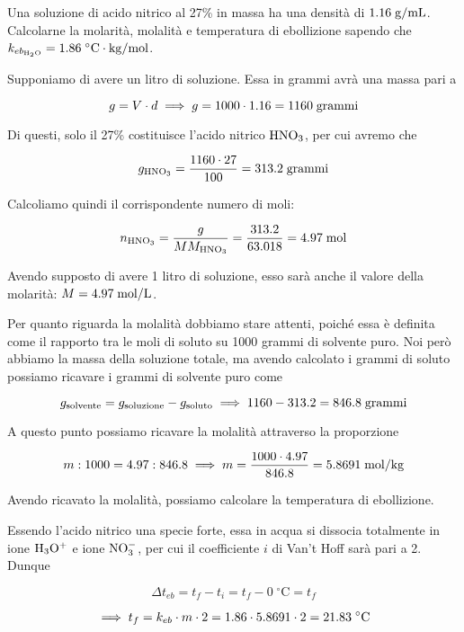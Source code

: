 \newpage

\begin{esercizio}
    Una soluzione di acido nitrico al 27\% in massa ha una densità di $1.16 \; \rm g/mL$. Calcolarne la molarità, molalità e temperatura di ebollizione sapendo che $k_{eb_{\rm H_2O}}=1.86 \; \rm ^{\circ}C \cdot kg/mol$.
\end{esercizio}
\begin{soluzione}
    Supponiamo di avere un litro di soluzione. Essa in grammi avrà una massa pari a

$$g=V \cdot d \implies g=1000 \cdot 1.16 = 1160 \; \rm grammi$$

Di questi, solo il 27\% costituisce l'acido nitrico $\rm HNO_3$, per cui avremo che

$$g_{\rm HNO_3}=\frac{1160 \cdot 27}{100}=313.2 \; \rm grammi$$

Calcoliamo quindi il corrispondente numero di moli:

$$n_{\rm HNO_3}=\frac{g}{MM_{\rm HNO_3}}
=\frac{313.2}{63.018}=4.97 \; \rm mol$$

Avendo supposto di avere 1 litro di soluzione, esso sarà anche il valore della molarità: $M=4.97 \; \rm mol/L$.

\vspace{0.2cm}Per quanto riguarda la molalità dobbiamo stare attenti, poiché essa è definita come il rapporto tra le moli di soluto su 1000 grammi di solvente puro. Noi però abbiamo la massa della soluzione totale, ma avendo calcolato i grammi di soluto possiamo ricavare i grammi di solvente puro come

$$g_{\rm solvente}=g_{\rm soluzione} - g_{\rm soluto}
\implies
1160 -313.2=846.8 \; \rm grammi$$

A questo punto possiamo ricavare la molalità attraverso la proporzione

$$m:1000=4.97:846.8
\implies
m=\frac{1000 \cdot 4.97}{846.8}=5.8691 \; \rm mol/kg$$

Avendo ricavato la molalità, possiamo calcolare la temperatura di ebollizione.

Essendo l'acido nitrico una specie forte, essa in acqua si dissocia totalmente in ione $\rm H_3O^+$ e ione $\rm NO_3^-$, per cui il coefficiente $i$ di Van't Hoff sarà pari a 2. Dunque

$$\Delta t_{eb}=t_f - t_i=t_f - 0 \; ^{\circ}\text{C}=t_f$$

$$\implies t_f
=k_{eb} \cdot m \cdot 2
=1.86 \cdot 5.8691 \cdot 2
=21.83 \; \rm ^{\circ}C$$
\end{soluzione}

